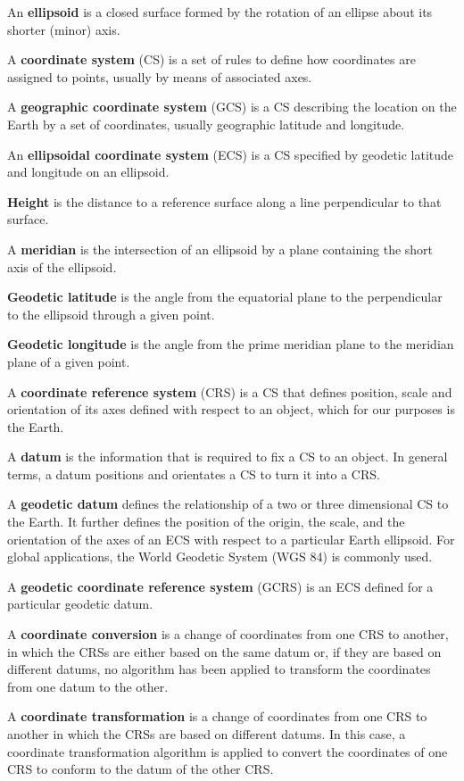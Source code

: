 \documentclass[10pt,a4paper]{article}
\begin{document}
An \textbf{ellipsoid} is a closed surface formed by the rotation of an ellipse about its shorter (minor) axis. 

A \textbf{coordinate system} (CS) is a set of rules to define how coordinates are assigned to points, usually by means of associated axes. 

A \textbf{geographic coordinate system} (GCS) is a CS describing the location on the Earth by a set of coordinates, usually geographic latitude and longitude.

An \textbf{ellipsoidal coordinate system} (ECS) is a CS specified by geodetic latitude and longitude on an ellipsoid. 

\textbf{Height} is the distance to a reference surface along a line perpendicular to that surface.

A \textbf{meridian} is the intersection of an ellipsoid by a plane containing the short axis of the ellipsoid.

\textbf{Geodetic latitude} is the angle from the equatorial plane to the perpendicular to the ellipsoid through a given point. 

\textbf{Geodetic longitude} is the angle from the prime meridian plane to the meridian plane of a given point. 

A \textbf{coordinate reference system} (CRS) is a CS that defines position, scale and orientation of its axes defined with respect to an object, which for our purposes is the Earth. 

A \textbf{datum} is the information that is required to fix a CS to an object. In general terms, a datum positions and orientates a CS to turn it into a CRS.

A \textbf{geodetic datum} defines the relationship of a two or three dimensional CS to the Earth. It further defines the position of the origin, the scale, and the orientation of the axes of an ECS with respect to a particular Earth ellipsoid. For global applications, the World Geodetic System (WGS 84) is commonly used.

A \textbf{geodetic coordinate reference system} (GCRS) is an ECS defined for a particular geodetic datum. 

A \textbf{coordinate conversion} is a change of coordinates from one CRS to another, in which the CRSs are either based on the same datum or, if they are based on different datums, no algorithm has been applied to transform the coordinates from one datum to the other. 

A \textbf{coordinate transformation} is a change of coordinates from one CRS to another in which the CRSs are based on different datums. In this case, a coordinate transformation algorithm is applied to convert the coordinates of one CRS to conform to the datum of the other CRS. 
\end{document}
